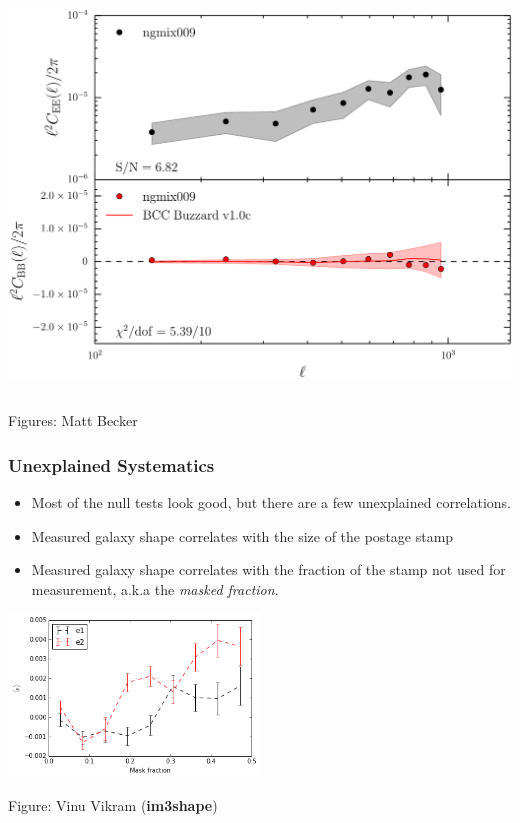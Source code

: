 \documentclass{beamer}
\newcommand{\imshape}{{\bf im3shape}}
\begin{document}
{\begin{columns}
        \begin{column}{0.5\textwidth}
            \begin{center}
                \includegraphics[width=1.05\textwidth]{ngmix009_eb_crop.pdf}
            \end{center}
        \end{column}

    \end{columns}
    {\tiny Figures: Matt Becker}
}

\frame
{
    \frametitle{Unexplained Systematics}

    \begin{itemize}

        \item Most of the null tests look good, but there are a few unexplained
            correlations.

        \item Measured galaxy shape correlates with the size of the postage stamp
    
         \item Measured galaxy shape correlates with the fraction of the stamp
             not used for measurement, a.k.a the {\em masked fraction}.

     \end{itemize}

    \begin{center}
        \includegraphics[width=0.5\textwidth]{im3shape-v-vs-mask-frac.png}
    \end{center}

     {\tiny Figure: Vinu Vikram (\imshape)}
}
\end{document}
